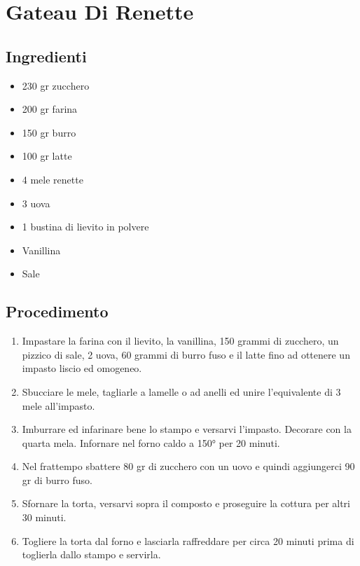 \section{Gateau Di Renette}
\subsection{Ingredienti}
\begin{itemize}
\item 230 gr zucchero  
\item 200 gr farina  
\item 150 gr burro  
\item 100 gr latte  
\item 4 mele renette  
\item 3 uova  
\item 1 bustina di lievito in polvere  
\item Vanillina  
\item Sale 
\end{itemize}
\subsection{Procedimento}
\begin{enumerate}
\item  Impastare la farina con il lievito, la vanillina, 150 grammi di zucchero, un pizzico di sale, 2 uova, 60 grammi di burro fuso e il latte fino ad ottenere un impasto liscio ed omogeneo.  
\item  Sbucciare le mele, tagliarle a lamelle o ad anelli ed unire l'equivalente di 3 mele all'impasto.  
\item  Imburrare ed infarinare bene lo stampo e versarvi l'impasto. Decorare con la quarta mela. Infornare nel forno caldo a 150° per 20 minuti.  
\item  Nel frattempo sbattere 80 gr di zucchero con un uovo e quindi aggiungerci 90 gr di burro fuso.  
\item  Sfornare la torta, versarvi sopra il composto e proseguire la cottura per altri 30 minuti.  
\item  Togliere la torta dal forno e lasciarla raffreddare per circa 20 minuti prima di toglierla dallo stampo e servirla.
\end{enumerate}
